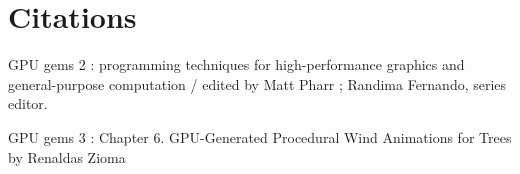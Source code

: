 \documentclass[11pt]{article}
\begin{document}
\section{Citations}
\begin{thebibliography}{9}

GPU gems 2 : programming techniques for high-performance graphics and general-purpose
computation / edited by Matt Pharr ; Randima Fernando, series editor.

GPU gems 3 : Chapter 6. GPU-Generated Procedural Wind Animations for Trees by Renaldas Zioma 
\end{thebibliography}
\end{document}
